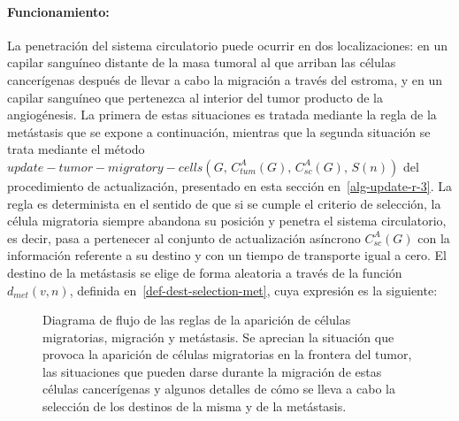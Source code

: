 \paragraph*{{Funcionamiento}:} La penetraci\'on del sistema circulatorio puede ocurrir en dos localizaciones: en un capilar sangu\'ineo distante de la masa tumoral al que arriban las c\'elulas cancer\'igenas despu\'es de llevar a cabo la migraci\'on a trav\'es del estroma, y en un capilar sangu\'ineo que pertenezca al interior del tumor producto de la angiog\'enesis. La primera de estas situaciones es tratada mediante la regla de la met\'astasis que se expone a continuaci\'on, mientras que la segunda situaci\'on se trata mediante el m\'etodo $update-tumor-migratory-cells(G,\,C_{tum}^A(G),\,C_{sc}^A(G),\,S(n))$ del procedimiento de actualizaci\'on, presentado en esta secci\'on en~\ref{alg-update-r-3}. La regla es determinista en el sentido de que si se cumple el criterio de selecci\'on, la c\'elula migratoria siempre abandona su posici\'on y penetra el sistema circulatorio, es decir, pasa a pertenecer al conjunto de actualizaci\'on as\'incrono $C_{sc}^A(G)$ con la informaci\'on referente a su destino y con un tiempo de transporte igual a cero. El destino de la met\'astasis se elige de forma aleatoria a trav\'es de la funci\'on $d_{met}(v,n)$, definida en~\ref{def-dest-selection-met}, cuya expresi\'on es la siguiente:
\begin{figure}[t!]
\begin{center}
\end{center}
\caption[Diagrama de flujo de las reglas de la aparici\'on de c\'elulas migratorias, migraci\'on y met\'astasis]{Diagrama de flujo de las reglas de la aparici\'on de c\'elulas migratorias, migraci\'on y met\'astasis. Se aprecian la situaci\'on que provoca la aparici\'on de c\'elulas migratorias en la frontera del tumor, las situaciones que pueden darse durante la migraci\'on de estas c\'elulas cancer\'igenas y algunos detalles de c\'omo se lleva a cabo la selecci\'on de los destinos de la misma y de la met\'astasis.}
\label{fig-flux-diagram-2}
\end{figure}
